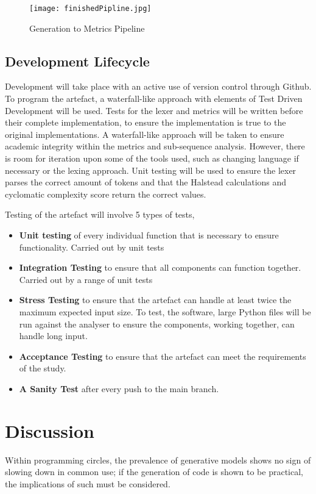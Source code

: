 \documentclass[manuscript,screen,review,sigconf]{acmart}
\begin{document}
\begin{figure}[h]
    \texttt{[image: finishedPipline.jpg]}
    \caption{Generation to Metrics Pipeline}
    \label{fig:CC Pipeline}
    \centering
\end{figure}

\subsection{Development Lifecycle}
Development will take place with an active use of version control through Github. To program the artefact, a waterfall-like approach with elements of Test Driven Development will be used. Tests for the lexer and metrics will be written before their complete implementation, to ensure the implementation is true to the original implementations. A waterfall-like approach will be taken to ensure academic integrity within the metrics and sub-sequence analysis. However, there is room for iteration upon some of the tools used, such as changing language if necessary or the lexing approach.
Unit testing will be used to ensure the lexer parses the correct amount of tokens and that the Halstead calculations and cyclomatic complexity score return the correct values.

Testing of the artefact will involve 5 types of tests,
\begin{itemize}
    \item \textbf{Unit testing} of every individual function that is necessary to ensure functionality. Carried out by unit tests
    \item \textbf{Integration Testing} to ensure that all components can function together. Carried out by a range of unit tests
    \item \textbf{Stress Testing} to ensure that the artefact can handle at least twice the maximum expected input size. To test, the software, large Python files will be run against the analyser to ensure the components, working together, can handle long input.
    \item \textbf{Acceptance Testing} to ensure that the artefact can meet the requirements of the study.
    \item \textbf{A Sanity Test} after every push to the main branch.
\end{itemize}


\section{Discussion}
Within programming circles, the prevalence of generative models shows no sign of slowing down in common use; if the generation of code is shown to be practical, the implications of such must be considered.
\end{document}
